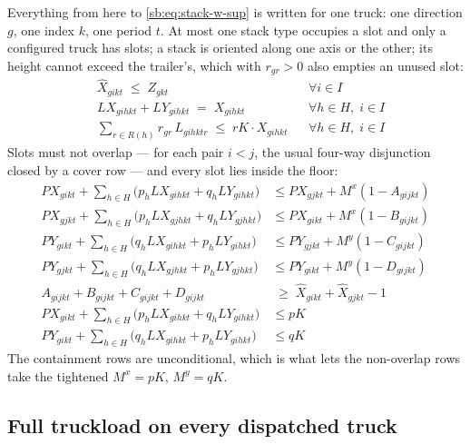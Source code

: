 Everything from here to \eqref{sb:eq:stack-w-sup} is written for one
truck: one direction $g$, one index $k$, one period $t$. At most one
stack type occupies a slot and only a configured truck has slots; a
stack is oriented along one axis or the other; its height cannot exceed
the trailer's, which with $r_{gr}>0$ also empties an unused slot:
\begin{align}
  & \widehat{X}_{gikt}\;\le\;Z_{gkt} && \forall i\in I
    \label{sb:eq:slot-active}\\
  & LX_{gihkt}+LY_{gihkt}\;=\;X_{gihkt} && \forall h\in H,\; i\in I
    \label{sb:eq:orient}\\
  & \sum_{r\in R(h)} r_{gr}\,L_{gihktr}\;\le\;rK\cdot X_{gihkt}
    && \forall h\in H,\; i\in I
    \label{sb:eq:height}
\end{align}
Slots must not overlap --- for each pair $i<j$, the usual four-way
disjunction closed by a cover row --- and every slot lies inside the
floor:
\begin{align}
PX_{gikt}+\sum_{h\in H}\bigl(p_{h}LX_{gihkt}+q_{h}LY_{gihkt}\bigr)
    &\le PX_{gjkt}+M^{x}(1-A_{gijkt})
    \label{sb:eq:nonov-x1}\\
PX_{gjkt}+\sum_{h\in H}\bigl(p_{h}LX_{gjhkt}+q_{h}LY_{gjhkt}\bigr)
    &\le PX_{gikt}+M^{x}(1-B_{gijkt})
    \label{sb:eq:nonov-x2}\\
PY_{gikt}+\sum_{h\in H}\bigl(q_{h}LX_{gihkt}+p_{h}LY_{gihkt}\bigr)
    &\le PY_{gjkt}+M^{y}(1-C_{gijkt})
    \label{sb:eq:nonov-y1}\\
PY_{gjkt}+\sum_{h\in H}\bigl(q_{h}LX_{gjhkt}+p_{h}LY_{gjhkt}\bigr)
    &\le PY_{gikt}+M^{y}(1-D_{gijkt})
    \label{sb:eq:nonov-y2}\\
A_{gijkt}+B_{gijkt}+C_{gijkt}+D_{gijkt}
    &\;\ge\;\widehat{X}_{gikt}+\widehat{X}_{gjkt}-1
    \label{sb:eq:cover}\\
PX_{gikt}+\sum_{h\in H}\bigl(p_{h}LX_{gihkt}+q_{h}LY_{gihkt}\bigr)
    &\le pK
    \label{sb:eq:cont-x}\\
PY_{gikt}+\sum_{h\in H}\bigl(q_{h}LX_{gihkt}+p_{h}LY_{gihkt}\bigr)
    &\le qK
    \label{sb:eq:cont-y}
\end{align}
The containment rows are unconditional, which is what lets the
non-overlap rows take the tightened $M^{x}=pK$, $M^{y}=qK$.

\subsection{Full truckload on every dispatched truck}

